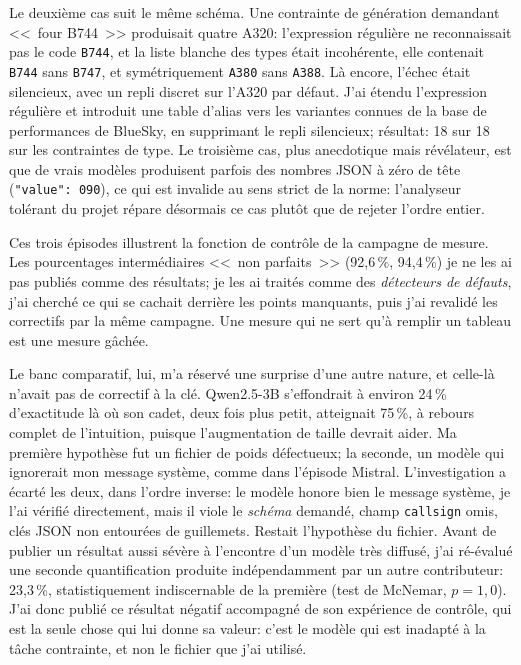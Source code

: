 \documentclass[11pt,a4paper]{article}
\begin{document}
Le deuxième cas suit le même schéma. Une contrainte de génération demandant <<~four B744~>> produisait quatre A320: l'expression régulière ne reconnaissait pas le code \texttt{B744}, et la liste blanche des types était incohérente, elle contenait \texttt{B744} sans \texttt{B747}, et symétriquement \texttt{A380} sans \texttt{A388}. Là encore, l'échec était silencieux, avec un repli discret sur l'A320 par défaut. J'ai étendu l'expression régulière et introduit une table d'alias vers les variantes connues de la base de performances de BlueSky, en supprimant le repli silencieux; résultat: 18 sur 18 sur les contraintes de type. Le troisième cas, plus anecdotique mais révélateur, est que de vrais modèles produisent parfois des nombres JSON à zéro de tête (\texttt{"value": 090}), ce qui est invalide au sens strict de la norme: l'analyseur tolérant du projet répare désormais ce cas plutôt que de rejeter l'ordre entier. 

Ces trois épisodes illustrent la fonction de contrôle de la campagne de mesure. Les pourcentages intermédiaires <<~non parfaits~>> (92,6\,\%, 94,4\,\%) je ne les ai pas publiés comme des résultats; je les ai traités comme des \emph{détecteurs de défauts}, j'ai cherché ce qui se cachait derrière les points manquants, puis j'ai revalidé les correctifs par la même campagne. Une mesure qui ne sert qu'à remplir un tableau est une mesure gâchée. 

\label{sec:qwen}
Le banc comparatif, lui, m'a réservé une surprise d'une autre nature, et celle-là n'avait pas de correctif à la clé. Qwen2.5-3B s'effondrait à environ 24\,\% d'exactitude là où son cadet, deux fois plus petit, atteignait 75\,\%, à rebours complet de l'intuition, puisque l'augmentation de taille devrait aider. Ma première hypothèse fut un fichier de poids défectueux; la seconde, un modèle qui ignorerait mon message système, comme dans l'épisode Mistral. L'investigation a écarté les deux, dans l'ordre inverse: le modèle honore bien le message système, je l'ai vérifié directement, mais il viole le \emph{schéma} demandé, champ \texttt{callsign} omis, clés JSON non entourées de guillemets. Restait l'hypothèse du fichier. Avant de publier un résultat aussi sévère à l'encontre d'un modèle très diffusé, j'ai ré-évalué une seconde quantification produite indépendamment par un autre contributeur: 23,3\,\%, statistiquement indiscernable de la première (test de McNemar, $p = 1{,}0$). J'ai donc publié ce résultat négatif accompagné de son expérience de contrôle, qui est la seule chose qui lui donne sa valeur: c'est le modèle qui est inadapté à la tâche contrainte, et non le fichier que j'ai utilisé. 
\end{document}
